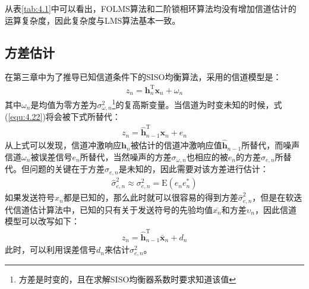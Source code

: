 从表\ref{tab:4.1}中可以看出，FOLMS算法和二阶锁相环算法均没有增加信道估计的运算复杂度，因此复杂度与LMS算法基本一致。
\subsection{方差估计}
在第三章中为了推导已知信道条件下的SISO均衡算法，采用的信道模型是：
\begin{eqnarray}
    z_n=\mathbf{h}_n^{\mathrm{T}}\mathbf{x}_n+\omega_n
    \label{equ:4.22}
\end{eqnarray}
其中$\omega_n$是均值为零方差为$\sigma_{\omega,n}^2$\footnote{方差是时变的，且在求解SISO均衡器系数时要求知道该值}的复高斯变量。当信道为时变未知的时候，式(\ref{equ:4.22})将会被下式所替代：
\begin{eqnarray}
    z_n=\hat{\mathbf{h}}_{n-1}^{\mathrm{T}}\mathbf{x}_n+e_n
    \label{equ:4.23}
\end{eqnarray}
从上式可以发现，信道冲激响应$\mathbf{h}_n$被估计的信道冲激响应值$\hat{\mathbf{h}}_{n-1}$所替代，而噪声信道$\omega_n$被误差信号$e_n$所替代，当然噪声的方差$\sigma_{\omega,n}$也相应的被$e_n$的方差$\sigma_{e,n}$所替代。但问题的关键在于方差$\sigma_{e,n}$是未知的，因此需要对该方差进行估计：
\begin{eqnarray}
    \hat{\sigma}_{e,n}^2\approx\sigma_{e,n}^2=\mathrm{E}(e_ne_n^*)
    \label{equ:4.24}
\end{eqnarray}
如果发送符号$x_n$都是已知的，那么此时就可以很容易的得到方差$\hat{\sigma}_{e,n}^2$，但是在软迭代信道估计算法中，已知的只有关于发送符号的先验均值$\bar{x_n}$和方差$\upsilon_n$，因此信道模型可以改写如下：
\begin{eqnarray}
    z_n=\hat{\mathbf{h}}_{n-1}^{\mathrm{T}}\bar{\mathbf{x}}_n+d_n
    \label{equ:4.25}
\end{eqnarray}
此时，可以利用误差信号$d_n$来估计$\sigma_{e,n}^2$。

